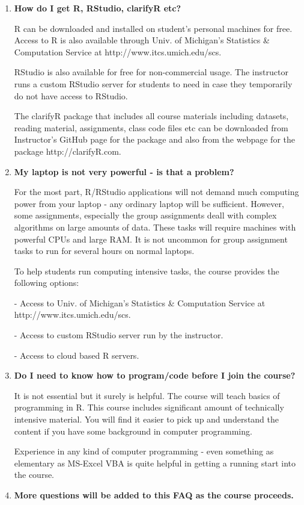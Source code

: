 \documentclass[10pt, letterpaper, twoside]{memoir}\usepackage{knitr}
\begin{document}
\begin{enumerate}

\item \textbf{How do I get R, RStudio, clarifyR etc?}

R can be downloaded and installed on student's personal machines for free. Access to R is also available through Univ. of Michigan's Statistics \& Computation Service at http://www.itcs.umich.edu/scs. 

RStudio is also available for free for non-commercial usage. The instructor runs a custom RStudio server for students to need in case they temporarily do not have access to RStudio.

The clarifyR package that includes all course materials including datasets, reading material, assignments, class code files etc can be downloaded from Instructor's GitHub page for the package and also from the webpage for the package http://clarifyR.com. 


\item \textbf{My laptop is not very powerful - is that a problem?}

For the most part, R/RStudio applications will not demand much computing power from your laptop - any ordinary laptop will be sufficient. However, some assignments, especially the group assignments deall with complex algorithms on large amounts of data. These tasks will require machines with powerful CPUs and large RAM. It is not uncommon for group assignment tasks to run for several hours on normal laptops.

To help students run computing intensive tasks, the course provides the following options:

- Access to Univ. of Michigan's Statistics \& Computation Service at http://www.itcs.umich.edu/scs.

- Access to custom RStudio server run by the instructor.

- Access to cloud based R servers.

\item \textbf{Do I need to know how to program/code before I join the course?}

It is not essential but it surely is helpful. The course will teach basics of programming in R. This course includes significant amount of technically intensive material. You will find it easier to pick up and understand the content if you have some background in computer programming. 

Experience in any kind of computer programming - even something as elementary as MS-Excel VBA is quite helpful in getting a running start into the course.

\item \textbf{More questions will be added to this FAQ as the course proceeds.}
\end{enumerate}
\end{document}
